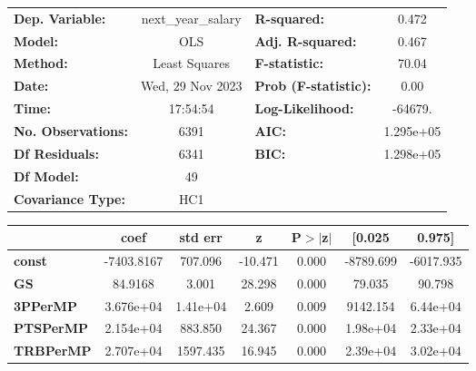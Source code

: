 \begin{center}
\begin{tabular}{lclc}
\toprule
\textbf{Dep. Variable:}       & next\_year\_salary & \textbf{  R-squared:         } &     0.472   \\
\textbf{Model:}               &        OLS         & \textbf{  Adj. R-squared:    } &     0.467   \\
\textbf{Method:}              &   Least Squares    & \textbf{  F-statistic:       } &     70.04   \\
\textbf{Date:}                &  Wed, 29 Nov 2023  & \textbf{  Prob (F-statistic):} &     0.00    \\
\textbf{Time:}                &      17:54:54      & \textbf{  Log-Likelihood:    } &   -64679.   \\
\textbf{No. Observations:}    &         6391       & \textbf{  AIC:               } & 1.295e+05   \\
\textbf{Df Residuals:}        &         6341       & \textbf{  BIC:               } & 1.298e+05   \\
\textbf{Df Model:}            &           49       & \textbf{                     } &             \\
\textbf{Covariance Type:}     &        HC1         & \textbf{                     } &             \\
\bottomrule
\end{tabular}
\begin{tabular}{lcccccc}
                              & \textbf{coef} & \textbf{std err} & \textbf{z} & \textbf{P$> |$z$|$} & \textbf{[0.025} & \textbf{0.975]}  \\
\midrule
\textbf{const}                &   -7403.8167  &      707.096     &   -10.471  &         0.000        &    -8789.699    &    -6017.935     \\
\textbf{GS}                   &      84.9168  &        3.001     &    28.298  &         0.000        &       79.035    &       90.798     \\
\textbf{3PPerMP}              &    3.676e+04  &     1.41e+04     &     2.609  &         0.009        &     9142.154    &     6.44e+04     \\
\textbf{PTSPerMP}             &    2.154e+04  &      883.850     &    24.367  &         0.000        &     1.98e+04    &     2.33e+04     \\
\textbf{TRBPerMP}             &    2.707e+04  &     1597.435     &    16.945  &         0.000        &     2.39e+04    &     3.02e+04     \\

\end{tabular}
\end{center}
